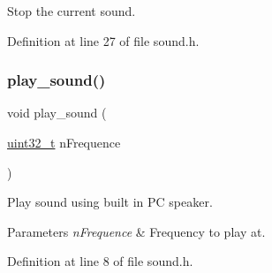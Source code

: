 Stop the current sound. 



Definition at line 27 of file sound.\+h.

\mbox{\label{a00026_a343fdfaf89e2f331018341d580fa2b82_a343fdfaf89e2f331018341d580fa2b82}} 
\subsubsection{\texorpdfstring{play\+\_\+sound()}{play\_sound()}}
{\footnotesize\ttfamily void play\+\_\+sound (\begin{DoxyParamCaption}\item[{\hyperlink{a00038_a435d1572bf3f880d55459d9805097f62_a435d1572bf3f880d55459d9805097f62}{uint32\+\_\+t}}]{n\+Frequence }\end{DoxyParamCaption})}



Play sound using built in PC speaker. 


\begin{DoxyParams}{Parameters}
{\em n\+Frequence} & Frequency to play at. \\
\hline
\end{DoxyParams}


Definition at line 8 of file sound.\+h.

